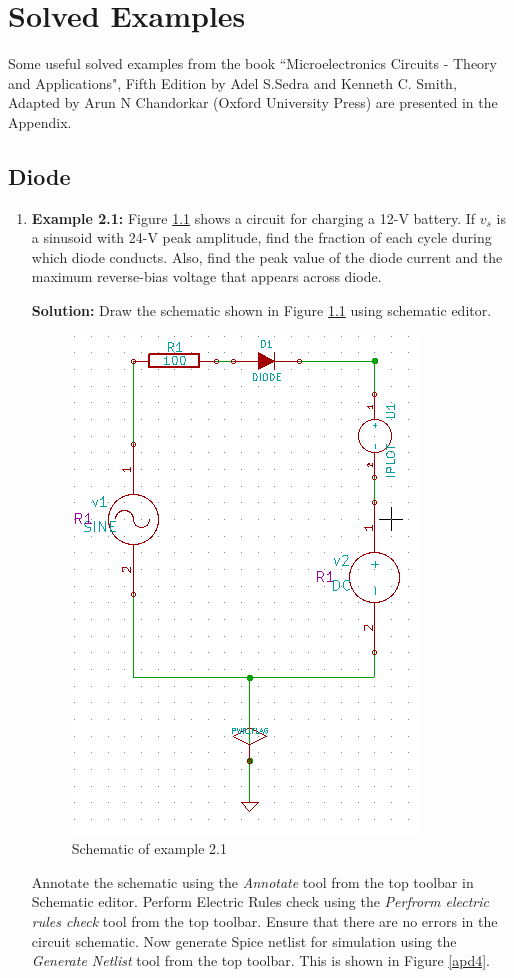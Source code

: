 \appendix
\chapter{Solved Examples}

Some useful solved examples from the book ``Microelectronics Circuits - Theory and Applications", Fifth Edition by Adel S.Sedra and Kenneth C. Smith, Adapted by Arun N Chandorkar (Oxford University Press) are presented in the Appendix.

\section {Diode}
\begin{enumerate}
\item \textbf {Example 2.1:} Figure \ref{sch1} shows a circuit for charging a 12-V battery. If $v_s$ is a sinusoid with 24-V peak amplitude, find the fraction of each cycle during which diode conducts. Also, find the peak value of the diode current and the maximum reverse-bias voltage that appears across diode.

\textbf {Solution:} Draw the schematic shown in Figure \ref{sch1} using schematic editor.
\begin{figure}%
\begin{center}
\includegraphics[width=0.5\linewidth]{figures/apd1.png}%
\caption{Schematic of example 2.1}
\label{sch1}
\end{center}
\end{figure}
Annotate the schematic using the \textit{Annotate} tool from the top toolbar in Schematic editor. Perform Electric Rules check using the \textit{Perfrorm electric rules check} tool from the top toolbar. Ensure that there are no errors in the circuit schematic. Now generate Spice netlist for simulation using the \textit{Generate Netlist} tool from the top toolbar. This is shown in Figure \ref{apd4}.


\end{enumerate}
